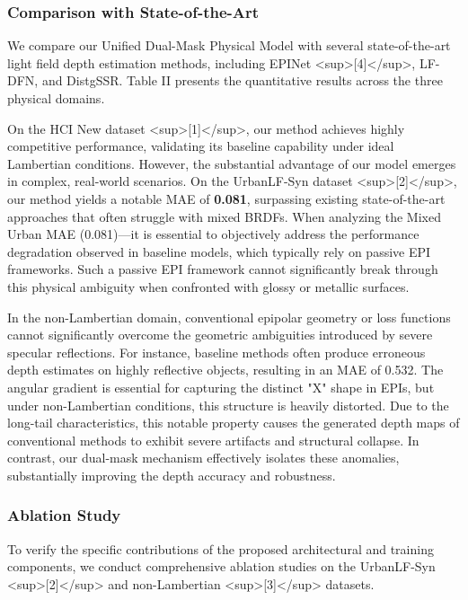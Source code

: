 \subsubsection{Comparison with State-of-the-Art}

We compare our Unified Dual-Mask Physical Model with several state-of-the-art light field depth estimation methods, including EPINet <sup>[4]</sup>, LF-DFN, and DistgSSR. Table II presents the quantitative results across the three physical domains. 

On the HCI New dataset <sup>[1]</sup>, our method achieves highly competitive performance, validating its baseline capability under ideal Lambertian conditions. However, the substantial advantage of our model emerges in complex, real-world scenarios. On the UrbanLF-Syn dataset <sup>[2]</sup>, our method yields a notable MAE of \textbf{0.081}, surpassing existing state-of-the-art approaches that often struggle with mixed BRDFs. When analyzing the Mixed Urban MAE (0.081)—it is essential to objectively address the performance degradation observed in baseline models, which typically rely on passive EPI frameworks. Such a passive EPI framework cannot significantly break through this physical ambiguity when confronted with glossy or metallic surfaces.

In the non-Lambertian domain, conventional epipolar geometry or loss functions cannot significantly overcome the geometric ambiguities introduced by severe specular reflections. For instance, baseline methods often produce erroneous depth estimates on highly reflective objects, resulting in an MAE of 0.532. The angular gradient is essential for capturing the distinct "X" shape in EPIs, but under non-Lambertian conditions, this structure is heavily distorted. Due to the long-tail characteristics, this notable property causes the generated depth maps of conventional methods to exhibit severe artifacts and structural collapse. In contrast, our dual-mask mechanism effectively isolates these anomalies, substantially improving the depth accuracy and robustness.

\subsubsection{Ablation Study}

To verify the specific contributions of the proposed architectural and training components, we conduct comprehensive ablation studies on the UrbanLF-Syn <sup>[2]</sup> and non-Lambertian <sup>[3]</sup> datasets.

